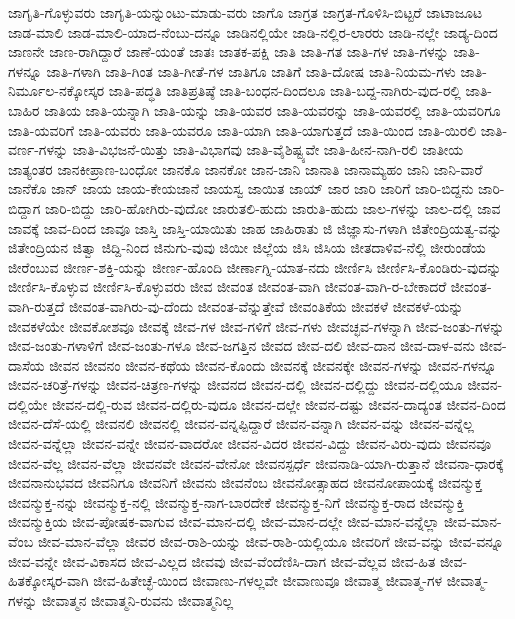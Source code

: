 {ಜಾಗೃತಿ-ಗೊಳ್ಳುವರು
ಜಾಗೃತಿ-ಯನ್ನುಂಟು-ಮಾಡು-ವರು
ಜಾಗೊ
ಜಾಗ್ರತ
ಜಾಗ್ರತ-ಗೊಳಿಸಿ-ಬಿಟ್ಟರೆ
ಜಾಟಾಜೂಟ
ಜಾಡ-ಮಾಲಿ
ಜಾಡ-ಮಾಲಿ-ಯಾದ-ನೆಂಬು-ದನ್ನೂ
ಜಾಡಿನಲ್ಲಿಯೇ
ಜಾಡಿ-ನಲ್ಲಿರ-ಲಾರರು
ಜಾಡಿ-ನಲ್ಲೇ
ಜಾಡ್ಯ-ದಿಂದ
ಜಾಣನೇ
ಜಾಣ-ರಾಗಿದ್ದಾರೆ
ಜಾಣೆ-ಯಂತೆ
ಜಾತಃ
ಜಾತಕ-ಪಕ್ಷಿ
ಜಾತಿ
ಜಾತಿ-ಗತ
ಜಾತಿ-ಗಳ
ಜಾತಿ-ಗಳನ್ನು
ಜಾತಿ-ಗಳನ್ನೂ
ಜಾತಿ-ಗಳಾಗಿ
ಜಾತಿ-ಗಿಂತ
ಜಾತಿ-ಗೀತೆ-ಗಳ
ಜಾತಿಗೂ
ಜಾತಿಗೆ
ಜಾತಿ-ದೋಷ
ಜಾತಿ-ನಿಯಮ-ಗಳು
ಜಾತಿ-ನಿರ್ಮೂಲ-ನಕ್ಕೋಸ್ಕರ
ಜಾತಿ-ಪದ್ಧತಿ
ಜಾತಿಪ್ರತಿಷ್ಠೆ
ಜಾತಿ-ಬಂಧನ-ದಿಂದಲೂ
ಜಾತಿ-ಬದ್ದ-ನಾಗಿರು-ವುದ-ರಲ್ಲಿ
ಜಾತಿ-ಬಾಹಿರ
ಜಾತಿಯ
ಜಾತಿ-ಯನ್ನಾಗಿ
ಜಾತಿ-ಯನ್ನು
ಜಾತಿ-ಯವರ
ಜಾತಿ-ಯವರನ್ನು
ಜಾತಿ-ಯವರಲ್ಲಿ
ಜಾತಿ-ಯವರಿಗೂ
ಜಾತಿ-ಯವರಿಗೆ
ಜಾತಿ-ಯವರು
ಜಾತಿ-ಯವರೂ
ಜಾತಿ-ಯಾಗಿ
ಜಾತಿ-ಯಾಗುತ್ತದೆ
ಜಾತಿ-ಯಿಂದ
ಜಾತಿ-ಯಿರಲಿ
ಜಾತಿ-ವರ್ಣ-ಗಳನ್ನು
ಜಾತಿ-ವಿಭಜನೆ-ಯಿತ್ತು
ಜಾತಿ-ವಿಭಾಗವು
ಜಾತಿ-ವೈಶಿಷ್ಟ್ಯವೇ
ಜಾತಿ-ಹೀನ-ನಾಗಿ-ರಲಿ
ಜಾತೀಯ
ಜಾತ್ಯಂತರ
ಜಾನಕೀಪ್ರಾಣ-ಬಂಧೋ
ಜಾನಕೊ
ಜಾನಕೋ
ಜಾನ-ಜಾನಿ
ಜಾನಾತಿ
ಜಾನಾಮ್ಯಹಂ
ಜಾನಿ
ಜಾನಿ-ವಾರೆ
ಜಾನೆಕೊ
ಜಾನ್
ಜಾಯ
ಜಾಯ-ಕೇಯಜಾನೆ
ಜಾಯಸ್ವ
ಜಾಯಿತ
ಜಾಯ್
ಜಾರ
ಜಾರಿ
ಜಾರಿಗೆ
ಜಾರಿ-ಬಿದ್ದನು
ಜಾರಿ-ಬಿದ್ದಾಗ
ಜಾರಿ-ಬಿದ್ದು
ಜಾರಿ-ಹೋಗಿರು-ವುದೋ
ಜಾರುತಲಿ-ಹುದು
ಜಾರುತಿ-ಹುದು
ಜಾಲ-ಗಳನ್ನು
ಜಾಲ-ದಲ್ಲಿ
ಜಾವ
ಜಾವಕ್ಕೆ
ಜಾವ-ದಿಂದ
ಜಾವೂ
ಜಾಸ್ತಿ
ಜಾಸ್ತಿ-ಯಾಯಿತು
ಜಾಹ
ಜಾಹಿರಾತು
ಜಿ
ಜಿಜ್ಞಾಸು-ಗಳಾಗಿ
ಜಿತೇಂದ್ರಿಯತ್ವ-ವನ್ನು
ಜಿತೇಂದ್ರಿಯನ
ಜಿತ್ವಾ
ಜಿದ್ದಿ-ನಿಂದ
ಜಿನುಗು-ವುವು
ಜಿಯೀ
ಜಿಲ್ಲೆಯ
ಜಿಸಿ
ಜಿಸಿಯ
ಜೀತದಾಳಿವ-ನೆಲ್ಲಿ
ಜೀರುಂಡೆಯ
ಜೀರೆಂಬುವ
ಜೀರ್ಣ-ಶಕ್ತಿ-ಯನ್ನು
ಜೀರ್ಣ-ಹೊಂದಿ
ಜೀರ್ಣಾಗ್ನಿ-ಯಾತ-ನದು
ಜೀರ್ಣಿಸಿ
ಜೀರ್ಣಿಸಿ-ಕೊಂಡಿರು-ವುದನ್ನು
ಜೀರ್ಣಿಸಿ-ಕೊಳ್ಳುವ
ಜೀರ್ಣಿಸಿ-ಕೊಳ್ಳುವರು
ಜೀವ
ಜೀವಂತ
ಜೀವಂತ-ವಾಗಿ
ಜೀವಂತ-ವಾಗಿ-ರ-ಬೇಕಾದರೆ
ಜೀವಂತ-ವಾಗಿ-ರುತ್ತದೆ
ಜೀವಂತ-ವಾಗಿರು-ವು-ದೆಂದು
ಜೀವಂತ-ವೆನ್ನುತ್ತೇವೆ
ಜೀವಂತಿಕೆಯ
ಜೀವಕಳೆ
ಜೀವಕಳೆ-ಯನ್ನು
ಜೀವಕಳೆಯೇ
ಜೀವಕೋಶವೂ
ಜೀವಕ್ಕೆ
ಜೀವ-ಗಳ
ಜೀವ-ಗಳಿಗೆ
ಜೀವ-ಗಳು
ಜೀವಚ್ಛವ-ಗಳನ್ನಾಗಿ
ಜೀವ-ಜಂತು-ಗಳನ್ನು
ಜೀವ-ಜಂತು-ಗಳಾಳಿಗೆ
ಜೀವ-ಜಂತು-ಗಳೂ
ಜೀವ-ಜಗತ್ತಿನ
ಜೀವದ
ಜೀವ-ದಲಿ
ಜೀವ-ದಾನ
ಜೀವ-ದಾಳ-ವನು
ಜೀವ-ದಾಸೆಯ
ಜೀವನ
ಜೀವನಂ
ಜೀವನ-ಕಥೆಯ
ಜೀವನ-ಕೊಂದು
ಜೀವನಕ್ಕೆ
ಜೀವನಕ್ಕೇ
ಜೀವನ-ಗಳನ್ನು
ಜೀವನ-ಗಳನ್ನೂ
ಜೀವನ-ಚರಿತ್ರೆ-ಗಳನ್ನು
ಜೀವನ-ಚಿತ್ರಣ-ಗಳನ್ನು
ಜೀವನದ
ಜೀವನ-ದಲ್ಲಿ
ಜೀವನ-ದಲ್ಲಿದ್ದು
ಜೀವನ-ದಲ್ಲಿಯೂ
ಜೀವನ-ದಲ್ಲಿಯೇ
ಜೀವನ-ದಲ್ಲಿ-ರುವ
ಜೀವನ-ದಲ್ಲಿರು-ವುದೂ
ಜೀವನ-ದಲ್ಲೇ
ಜೀವನ-ದಷ್ಟು
ಜೀವನ-ದಾದ್ಯಂತ
ಜೀವನ-ದಿಂದ
ಜೀವನ-ದೆಸೆ-ಯಲ್ಲಿ
ಜೀವನಲಿ
ಜೀವನಲ್ಲಿ
ಜೀವನ-ವನ್ನಪ್ಪಿದ್ದಾರೆ
ಜೀವನ-ವನ್ನಾಗಿ
ಜೀವನ-ವನ್ನು
ಜೀವನ-ವನ್ನೆಲ್ಲ
ಜೀವನ-ವನ್ನೆಲ್ಲಾ
ಜೀವನ-ವನ್ನೇ
ಜೀವನ-ವಾದರೋ
ಜೀವನ-ವಿದರ
ಜೀವನ-ವಿದ್ದು
ಜೀವನ-ವಿರು-ವುದು
ಜೀವನವೂ
ಜೀವನ-ವೆಲ್ಲ
ಜೀವನ-ವೆಲ್ಲಾ
ಜೀವನವೇ
ಜೀವನ-ವೇನೋ
ಜೀವನಸ್ಪರ್ಧೆ
ಜೀವನಾಡಿ-ಯಾಗಿ-ರುತ್ತಾನೆ
ಜೀವನಾ-ಧಾರಕ್ಕೆ
ಜೀವನಾನುಭವದ
ಜೀವನಿಗೂ
ಜೀವನಿಗೆ
ಜೀವನು
ಜೀವನೆಂಬ
ಜೀವನೋತ್ಸಾಹದ
ಜೀವನೋಪಾಯಕ್ಕೆ
ಜೀವನ್ಮುಕ್ತ
ಜೀವನ್ಮುಕ್ತ-ನನ್ನು
ಜೀವನ್ಮುಕ್ತ-ನಲ್ಲಿ
ಜೀವನ್ಮುಕ್ತ-ನಾಗ-ಬಾರದೇಕೆ
ಜೀವನ್ಮುಕ್ತ-ನಿಗೆ
ಜೀವನ್ಮುಕ್ತ-ರಾದ
ಜೀವನ್ಮುಕ್ತಿ
ಜೀವನ್ಮುಕ್ತಿಯ
ಜೀವ-ಪೋಷಕ-ವಾಗುವ
ಜೀವ-ಮಾನ-ದಲ್ಲಿ
ಜೀವ-ಮಾನ-ದಲ್ಲೇ
ಜೀವ-ಮಾನ-ವನ್ನೆಲ್ಲಾ
ಜೀವ-ಮಾನ-ವೆಂಬ
ಜೀವ-ಮಾನ-ವೆಲ್ಲಾ
ಜೀವರ
ಜೀವ-ರಾಶಿ-ಯನ್ನು
ಜೀವ-ರಾಶಿ-ಯಲ್ಲಿಯೂ
ಜೀವರಿಗೆ
ಜೀವ-ವನ್ನು
ಜೀವ-ವನ್ನೂ
ಜೀವ-ವನ್ನೇ
ಜೀವ-ವಿಕಾಸದ
ಜೀವ-ವಿಲ್ಲದ
ಜೀವವು
ಜೀವ-ವೆಂದೆಣಿಸಿ-ದಾಗ
ಜೀವ-ವೆಲ್ಲವ
ಜೀವ-ಹಿತ
ಜೀವ-ಹಿತಕ್ಕೋಸ್ಕರ-ವಾಗಿ
ಜೀವ-ಹಿತೇಚ್ಛೆ-ಯಿಂದ
ಜೀವಾಣು-ಗಳಲ್ಲವೇ
ಜೀವಾಣುವೂ
ಜೀವಾತ್ಮ
ಜೀವಾತ್ಮ-ಗಳ
ಜೀವಾತ್ಮ-ಗಳನ್ನು
ಜೀವಾತ್ಮನ
ಜೀವಾತ್ಮನಿ-ರುವನು
ಜೀವಾತ್ಮನಿಲ್ಲ
}

